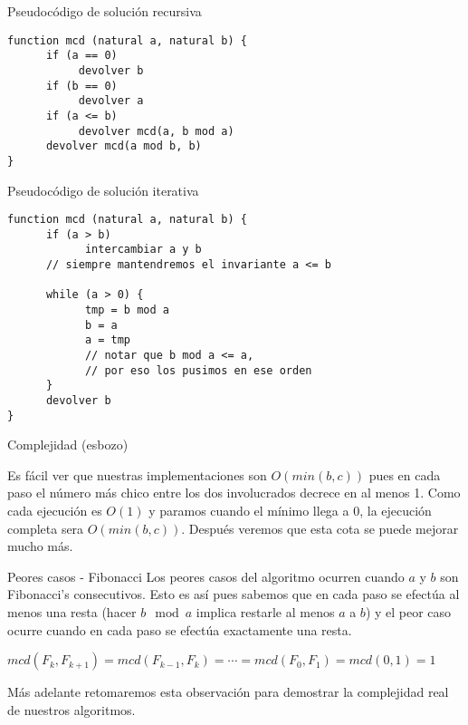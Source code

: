 \documentclass[compress]{beamer}
\begin{document}
\begin{frame}[fragile]{Pseudoc\'odigo de soluci\'on recursiva}
\begin{verbatim}
function mcd (natural a, natural b) {
      if (a == 0)
           devolver b
      if (b == 0)
           devolver a
      if (a <= b)
           devolver mcd(a, b mod a)
      devolver mcd(a mod b, b)
}
\end{verbatim}
\end{frame}

\begin{frame}[fragile]{Pseudoc\'odigo de soluci\'on iterativa}
\begin{verbatim}
function mcd (natural a, natural b) {
      if (a > b)
            intercambiar a y b
      // siempre mantendremos el invariante a <= b

      while (a > 0) {
            tmp = b mod a
            b = a
            a = tmp
            // notar que b mod a <= a, 
            // por eso los pusimos en ese orden
      }
      devolver b
}
\end{verbatim}
\end{frame}

\begin{frame}{Complejidad (esbozo)}

Es f\'acil ver que nuestras implementaciones son $O(min(b,c))$ pues en cada paso el n\'umero m\'as chico entre los dos involucrados decrece en al menos 1. Como cada ejecuci\'on es $O(1)$ y
paramos cuando el m\'inimo llega a 0, la ejecuci\'on completa sera $O(min(b,c))$. Despu\'es veremos que esta cota se puede mejorar mucho m\'as. \\ \bigskip

\end{frame}

\begin{frame}{Peores casos - Fibonacci}
Los peores casos del algoritmo ocurren cuando $a$ y $b$ son Fibonacci's consecutivos. Esto es as\'i pues sabemos que en cada paso se efect\'ua al menos una resta (hacer $b \mod{a}$ implica
restarle al menos $a$ a $b$) y el peor caso ocurre cuando en cada paso se efect\'ua exactamente una resta. \\ \bigskip

$mcd(F_{k}, F_{k+1}) = mcd(F_{k-1}, F_{k}) = \cdots = mcd(F_{0}, F_{1}) = mcd(0,1) = 1$ \\ \bigskip

M\'as adelante retomaremos esta observaci\'on para demostrar la complejidad real de nuestros algoritmos.
\end{frame}
\end{document}
